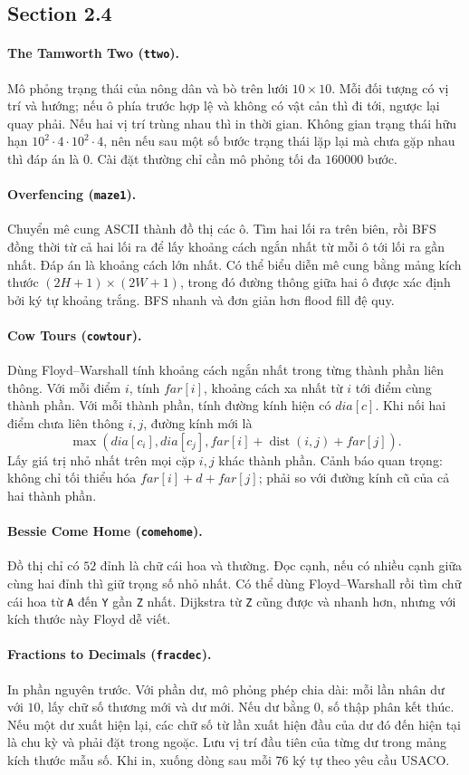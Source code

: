 \documentclass[11pt]{article}
\newcommand{\problem}[2]{\paragraph{#1 (\texttt{#2}).}}
\begin{document}
\subsection*{Section 2.4}

\problem{The Tamworth Two}{ttwo}
Mô phỏng trạng thái của nông dân và bò trên lưới \(10\times10\). Mỗi đối tượng có vị trí và hướng; nếu ô phía trước hợp lệ và không có vật cản thì đi tới, ngược lại quay phải. Nếu hai vị trí trùng nhau thì in thời gian. Không gian trạng thái hữu hạn \(10^2\cdot4\cdot10^2\cdot4\), nên nếu sau một số bước trạng thái lặp lại mà chưa gặp nhau thì đáp án là \(0\). Cài đặt thường chỉ cần mô phỏng tối đa \(160000\) bước.

\problem{Overfencing}{maze1}
Chuyển mê cung ASCII thành đồ thị các ô. Tìm hai lối ra trên biên, rồi BFS đồng thời từ cả hai lối ra để lấy khoảng cách ngắn nhất từ mỗi ô tới lối ra gần nhất. Đáp án là khoảng cách lớn nhất. Có thể biểu diễn mê cung bằng mảng kích thước \((2H+1)\times(2W+1)\), trong đó đường thông giữa hai ô được xác định bởi ký tự khoảng trắng. BFS nhanh và đơn giản hơn flood fill đệ quy.

\problem{Cow Tours}{cowtour}
Dùng Floyd--Warshall tính khoảng cách ngắn nhất trong từng thành phần liên thông. Với mỗi điểm \(i\), tính \(far[i]\), khoảng cách xa nhất từ \(i\) tới điểm cùng thành phần. Với mỗi thành phần, tính đường kính hiện có \(dia[c]\). Khi nối hai điểm chưa liên thông \(i,j\), đường kính mới là
\[
  \max(dia[c_i],dia[c_j],far[i]+\operatorname{dist}(i,j)+far[j]).
\]
Lấy giá trị nhỏ nhất trên mọi cặp \(i,j\) khác thành phần. Cảnh báo quan trọng: không chỉ tối thiểu hóa \(far[i]+d+far[j]\); phải so với đường kính cũ của cả hai thành phần.

\problem{Bessie Come Home}{comehome}
Đồ thị chỉ có \(52\) đỉnh là chữ cái hoa và thường. Đọc cạnh, nếu có nhiều cạnh giữa cùng hai đỉnh thì giữ trọng số nhỏ nhất. Có thể dùng Floyd--Warshall rồi tìm chữ cái hoa từ \texttt{A} đến \texttt{Y} gần \texttt{Z} nhất. Dijkstra từ \texttt{Z} cũng được và nhanh hơn, nhưng với kích thước này Floyd dễ viết.

\problem{Fractions to Decimals}{fracdec}
In phần nguyên trước. Với phần dư, mô phỏng phép chia dài: mỗi lần nhân dư với \(10\), lấy chữ số thương mới và dư mới. Nếu dư bằng \(0\), số thập phân kết thúc. Nếu một dư xuất hiện lại, các chữ số từ lần xuất hiện đầu của dư đó đến hiện tại là chu kỳ và phải đặt trong ngoặc. Lưu vị trí đầu tiên của từng dư trong mảng kích thước mẫu số. Khi in, xuống dòng sau mỗi \(76\) ký tự theo yêu cầu USACO.
\end{document}
